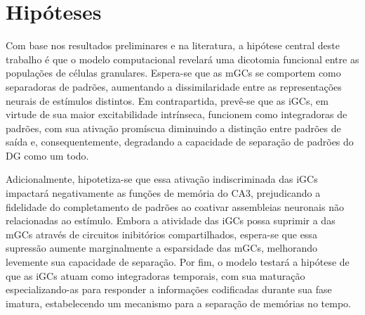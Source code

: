 \chapter{Hipóteses}

Com base nos resultados preliminares e na literatura, a hipótese central deste trabalho é que o modelo computacional revelará uma
dicotomia funcional entre as populações de células granulares. Espera-se que as mGCs se comportem como separadoras de padrões,
aumentando a dissimilaridade entre as representações neurais de estímulos distintos. Em contrapartida, prevê-se que as iGCs, em
virtude de sua maior excitabilidade intrínseca, funcionem como integradoras de padrões, com sua ativação promíscua diminuindo a
distinção entre padrões de saída e, consequentemente, degradando a capacidade de separação de padrões do DG como um todo.

Adicionalmente, hipotetiza-se que essa ativação indiscriminada das iGCs impactará negativamente as funções de memória do CA3,
prejudicando a fidelidade do completamento de padrões ao coativar assembleias neuronais não relacionadas ao estímulo. Embora a
atividade das iGCs possa suprimir a das mGCs através de circuitos inibitórios compartilhados, espera-se que essa supressão aumente
marginalmente a esparsidade das mGCs, melhorando levemente sua capacidade de separação. Por fim, o modelo testará a hipótese de
que as iGCs atuam como integradoras temporais, com sua maturação especializando-as para responder a informações codificadas
durante sua fase imatura, estabelecendo um mecanismo para a separação de memórias no tempo.

